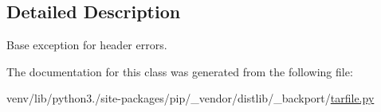 \subsection{Detailed Description}
\begin{DoxyVerb}Base exception for header errors.\end{DoxyVerb}
 

The documentation for this class was generated from the following file\+:\begin{DoxyCompactItemize}
\item 
venv/lib/python3./site-\/packages/pip/\+\_\+vendor/distlib/\+\_\+backport/\hyperlink{tarfile_8py}{tarfile.\+py}\end{DoxyCompactItemize}
